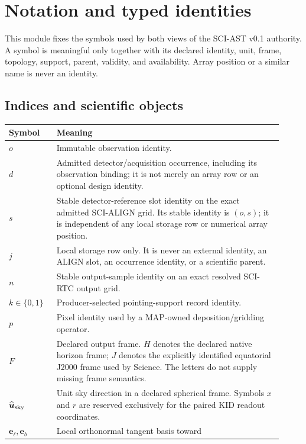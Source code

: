 \section{Notation and typed identities}
\label{sec:notation}

This module fixes the symbols used by both views of the SCI-AST v0.1
authority.  A symbol is meaningful only together with its declared identity,
unit, frame, topology, support, parent, validity, and availability.  Array
position or a similar name is never an identity.

\subsection{Indices and scientific objects}

\begin{longtable}{>{\raggedright\arraybackslash}p{0.16\linewidth}
                  >{\raggedright\arraybackslash}p{0.76\linewidth}}
\toprule
Symbol & Meaning \\
\midrule
\endhead
$o$ & Immutable observation identity. \\
$d$ & Admitted detector/acquisition occurrence, including its observation
binding; it is not merely an array row or an optional design identity. \\
$s$ & Stable detector-reference slot identity on the exact admitted SCI-ALIGN
grid.  Its stable identity is $(o,s)$; it is independent of any local storage
row or numerical array position. \\
$j$ & Local storage row only.  It is never an external identity, an ALIGN
slot, an occurrence identity, or a scientific parent. \\
$n$ & Stable output-sample identity on an exact resolved SCI-RTC output grid. \\
$k\in\{0,1\}$ & Producer-selected pointing-support record identity. \\
$p$ & Pixel identity used by a MAP-owned deposition/gridding operator. \\
$F$ & Declared output frame.  $H$ denotes the declared native horizon frame;
$J$ denotes the explicitly identified equatorial J2000 frame used by Science.
The letters do not supply missing frame semantics. \\
$\widehat{\boldsymbol u}_{\rm sky}$ & Unit sky direction in a declared
spherical frame.  Symbols $x$ and $r$ are reserved exclusively for the paired
KID readout coordinates. \\
$\boldsymbol e_\ell,\boldsymbol e_b$ & Local orthonormal tangent basis toward

\end{longtable}
